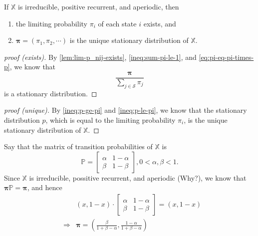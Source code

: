 \begin{theorem}
If $ \mathbb{X} $ is irreducible, positive recurrent, and aperiodic, then
\begin{enumerate}
  \item the limiting probability $ \pi_{i} $ of each state $ i $ exists, and
  \item $ \boldsymbol\pi = (\pi_{1}, \pi_{2}, \cdots) $ is the unique stationary distribution of $ \mathbb{X} $.
\end{enumerate}

\begin{proof}[proof (exists)]
By \autoref{lem:lim-p_nij-exists}, \autoref{ineq:sum-pi-le-1}, and \autoref{eq:pi-eq-pi-times-p}, we know that
\[ \frac{\boldsymbol\pi}{\sum_{j \in \mathcal{S}} \pi_{j}} \]
is a stationary distribution.
\end{proof}

\begin{comment}
By \autoref{lem:lim-p_nij-exists}, we know that the limiting probability $ \pi_{i} $ exists for all $ i \in \mathcal{S} $,
\[ \sum_{j \in \mathcal{S}} \pi_{j} \neq \infty, \text{\hspace{1em} \small (by \autoref{ineq:sum-pi-le-1})} \]
and
\[ \frac{\boldsymbol\pi}{\sum_{j \in \mathcal{S}} \pi_{j}} = \frac{\boldsymbol\pi \mathbb{P}}{\sum_{j \in \mathcal{S}} \pi_{j}}. \text{\hspace{1em} \small (by \autoref{eq:pi-eq-pi-times-p})} \]
\end{comment}

\begin{proof}[proof (unique)]
By \autoref{ineq:p-ge-pi} and \autoref{ineq:p-le-pi}, we know that the stationary distribution $ p $, which is equal to the limiting probability $ \pi_{i} $, is the unique stationary distribution of $ \mathbb{X} $.
\end{proof}
\end{theorem}

\begin{example}
Say that the matrix of transition probabilities of $ \mathbb{X} $ is
\[ \mathbb{P} = \begin{bmatrix}
  \alpha  & 1 - \alpha \\
  \beta   & 1 - \beta
\end{bmatrix}, 0 < \alpha, \beta < 1. \]
Since $ \mathbb{X} $ is irreducible, possitive recurrent, and aperiodic {\color{red} (Why?)}, we know that $ \boldsymbol\pi \mathbb{P} = \boldsymbol\pi $, and hence
\begin{eqnarray*}
& & (x, 1 - x) \cdot \begin{bmatrix}
  \alpha  & 1 - \alpha \\
  \beta   & 1 - \beta
\end{bmatrix} = (x, 1 - x) \\
& \Rightarrow & \boldsymbol\pi = \left( \frac{\beta}{1 + \beta - \alpha}, \frac{1 - \alpha}{1 + \beta - \alpha} \right)
\end{eqnarray*}
\end{example}

